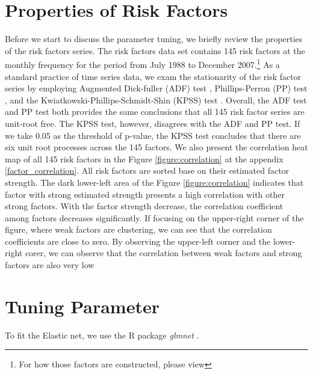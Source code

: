 \section{Properties of Risk Factors}
Before we start to discuss the parameter tuning, we briefly review the properties of the risk factors series.
The risk factors data set contains 145 risk factors at the monthly frequency for the period from July 1988 to December 2007.\footnote{For how those factors are constructed, please view }
As a standard practice of time series data, we exam the stationarity of the risk factor series by employing Augmented Dick-fuller (ADF) test  \cite{Dickey1979},  Phillips-Perron (PP) test \cite{Phillips1988}, and the Kwiatkowski-Phillips-Schmidt-Shin (KPSS) test \cite{Kwiatkowski1992}.
Overall, the ADF test and PP test both provides the same conclusions that all 145 risk factor series are unit-root free.
The KPSS test, however, disagrees with the ADF and PP test.
If we take 0.05 as the threshold of p-value, the KPSS test concludes that there are six unit root processes across the 145 factors.
We also present the correlation heat map of all 145 risk factors in the Figure \ref{figure:correlation} at the appendix \ref{factor_correlation}.
All risk factors are sorted base on their estimated factor strength.
The dark lower-left area of the Figure \ref{figure:correlation} indicates that factor with strong estimated strength presents a high correlation with other strong factors.
With the factor strength decrease, the correlation coefficient among factors decreases significantly.
If focusing on the upper-right corner of the figure, where weak factors are clustering, we can see that the correlation coefficients are close to zero.
By observing the upper-left corner and the lower-right corer, we can observe that the correlation between weak factors and strong factors are also very low


\section{Tuning Parameter} \label{EN:parameter_tuning }
To fit the Elastic net, we use the R package \textit{glmnet} \cite{Friedman2010, Simon2011}.

